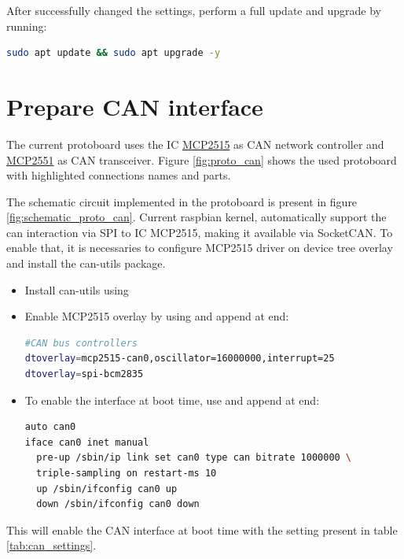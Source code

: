 After successfully changed the settings, perform a full update and upgrade by running:
\begin{lstlisting}[frame=none,language=bash,backgroundcolor=\color{gray!15},numbers=none]
sudo apt update && sudo apt upgrade -y
\end{lstlisting}


\section{Prepare CAN interface}
\label{section:can}
The current protoboard uses the \gls{IC} \href{https://www.microchip.com/wwwproducts/en/MCP2515}{MCP2515} as \gls{CAN} network controller and \href{https://www.microchip.com/wwwproducts/en/MCP2551}{MCP2551} as \gls{CAN} transceiver. Figure \ref{fig:proto_can} shows the used protoboard with highlighted connections names and parts.

The schematic circuit implemented in the protoboard is present in figure \ref{fig:schematic_proto_can}.
Current raspbian kernel, automatically support the can interaction via \gls{SPI} to \gls{IC} MCP2515, making it available via SocketCAN. To enable that, it is necessaries to configure MCP2515 driver on device tree overlay and install the can-utils package.
\begin{itemize}
	\tightlist
	\item Install can-utils using 
	\item Enable MCP2515 overlay by using  and append at end:
	\begin{lstlisting}[label={lst:boot_settings},frame=none,language=bash,backgroundcolor=\color{gray!15},numbers=none,basicstyle=\ttfamily]
#CAN bus controllers
dtoverlay=mcp2515-can0,oscillator=16000000,interrupt=25
dtoverlay=spi-bcm2835
\end{lstlisting}
	\item To enable the interface at boot time, use  and append at end:
	\begin{minipage}{\linewidth} %
\begin{lstlisting}[frame=none,language=bash,backgroundcolor=\color{gray!15},numbers=none,		basicstyle=\ttfamily]
auto can0
iface can0 inet manual
  pre-up /sbin/ip link set can0 type can bitrate 1000000 \
  triple-sampling on restart-ms 10
  up /sbin/ifconfig can0 up
  down /sbin/ifconfig can0 down
\end{lstlisting}
	\end{minipage}
\end{itemize}
This will enable the \gls{CAN} interface at boot time with the setting present in table \ref{tab:can_settings}.

